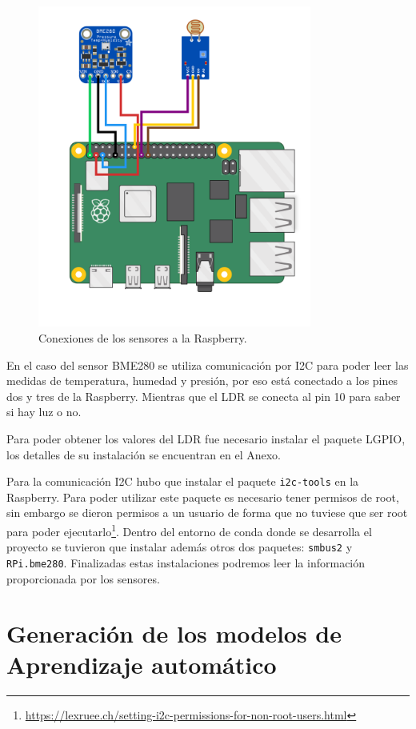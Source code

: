 \documentclass[a4paper, 12pt]{book}
\begin{document}
\begin{figure}[]
  \centering
  \includegraphics[width=9cm, keepaspectratio]{img/circuito.png}
  \caption{Conexiones de los sensores a la Raspberry.}\label{fig:circuito}
\end{figure}

En el caso del sensor BME280 se utiliza comunicación por I2C para poder leer las medidas de temperatura, humedad y presión, por eso está conectado a los pines dos y tres de la Raspberry. Mientras que el LDR se conecta al pin 10 para saber si hay luz o no.

Para poder obtener los valores del LDR fue necesario instalar el paquete LGPIO, los detalles de su instalación se encuentran en el Anexo.

Para la comunicación I2C hubo que instalar el paquete \texttt{i2c-tools} en la Raspberry. Para poder utilizar este paquete es necesario tener permisos de root, sin embargo se dieron permisos a un usuario de forma que no tuviese que ser root para poder ejecutarlo\footnote{\url{https://lexruee.ch/setting-i2c-permissions-for-non-root-users.html}}. Dentro del entorno de conda donde se desarrolla el proyecto se tuvieron que instalar además otros dos paquetes: \texttt{smbus2} y \texttt{RPi.bme280}. Finalizadas estas instalaciones podremos leer la información proporcionada por los sensores.

\section{Generación de los modelos de Aprendizaje automático}
\label{sec:generacion_modelos}
\end{document}
